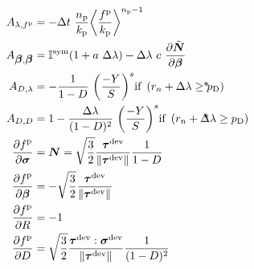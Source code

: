\begin{align*}
	A_{\lambda,\Fp}   & = - \Delta t \contraction \frac{\np}{\kp} {\left\langle \frac{\Fp}{\kp} \right\rangle}^{\np-1}                                                                                                                                                             \\
	A_{\fbeta,\fbeta} & = \ffI^{\rm sym} (1+a\contraction \Delta \lambda) - \Delta \lambda \contraction c \contraction \pd{\z{\fN}}{\fbeta}                                                                                                                                        \\
	A_{D,\lambda}     & = - \ds \frac{1}{1-D} \contraction {\left( \frac{ - Y }{S} \right)}^{s} \text{if }\left(r_n + \Delta \lambda \geq p_{\rm D}\right)                                                                                           &  & \text{ \hspace*{-2cm} *} \\
	A_{D,D}           & = 1 - \ds \frac{{\Delta \lambda}}{(1-D)^2} \contraction {\left( \frac{ - Y }{S} \right)}^{s} \text{if } \left(r_n + \Delta \lambda \geq p_{\rm D}\right)                                                                     &  & \text{ \hspace*{-2cm} *} \\
	\pd{\Fp}{\fsigma} & = \fN = \sqrt{\frac{3}{2}} \frac{\ftau^{\rm dev}}{ \normg{\ftau^{\rm dev}}{}} \frac{1}{1-D}                                                                                                                                                                \\
	\pd{\Fp}{\fbeta}  & = - \sqrt{\frac{3}{2}} \frac{\ftau^{\rm dev}}{ \normg{\ftau^{\rm dev}}{}}                                                                                                                                                                                  \\
	\pd{\Fp}{R}       & = -1                                                                                                                                                                                                                                                       \\
	\pd{\Fp}{D}       & = \sqrt{\frac{3}{2}} \frac{\ftau^{\rm dev} \dcontraction \fsigma^{\rm dev}}{ \normg{\ftau^{\rm dev}}{}}  \frac{1}{(1-D)^2}                                                                                                                                 \\

\end{align*}
